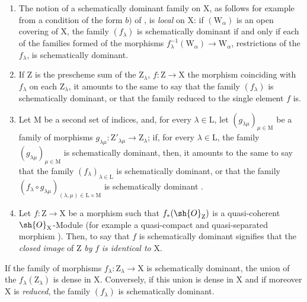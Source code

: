 \begin{remarks}[11.10.3]
\label{IV.11.10.3}
\medskip\noindent
\begin{enumerate}[label=(\roman*)]
  \item The notion of a schematically dominant family on $\mathrm{X}$, as follows for example from a condition of the form $b)$ of , is \emph{local} on $\mathrm{X}$: if $(\mathrm{W}_\alpha)$ is an open covering of $\mathrm{X}$, the family $(f_\lambda)$ is schematically dominant if and only if each of the families formed of the morphisms $f_\lambda^{-1}(\mathrm{W}_\alpha)\to\mathrm{W}_\alpha$, restrictions of the $f_\lambda$, is schematically dominant.
  \item If $\mathrm{Z}$ is the prescheme sum of the $\mathrm{Z}_\lambda$, $f:\mathrm{Z}\to\mathrm{X}$ the morphism coinciding with $f_\lambda$ on each $\mathrm{Z}_\lambda$, it amounts to the same to say that the family $(f_\lambda)$ is schematically dominant, or that the family reduced to the single element $f$ is.
  \item Let $\mathrm{M}$ be a second set of indices, and, for every $\lambda\in\mathrm{L}$, let $(g_{\lambda\mu})_{\mu\in\mathrm{M}}$ be a family of morphisms $g_{\lambda\mu}:\mathrm{Z}'_{\lambda\mu}\to\mathrm{Z}_\lambda$; if, for every $\lambda\in\mathrm{L}$, the family $(g_{\lambda\mu})_{\mu\in\mathrm{M}}$ is schematically dominant, then, it amounts to the same to say that the family $(f_\lambda)_{\lambda\in\mathrm{L}}$ is schematically dominant, or that the family $(f_\lambda\circ g_{\lambda\mu})_{(\lambda,\mu)\in\mathrm{L}\times\mathrm{M}}$ is schematically dominant .
  \item Let $f:\mathrm{Z}\to\mathrm{X}$ be a morphism such that $f_*(\sh{O}_\mathrm{Z})$ is a quasi-coherent $\sh{O}_\mathrm{X}$-Module (for example a quasi-compact and quasi-separated morphism ).
  Then, to say that $f$ is schematically dominant signifies that the \emph{closed image} of $\mathrm{Z}$ \emph{by} $f$  \emph{is identical to} $\mathrm{X}$.
\end{enumerate}
\end{remarks}

\begin{proposition}[11.10.4]
\label{IV.11.10.4}
If the family of morphisms $f_\lambda:\mathrm{Z}_\lambda\to\mathrm{X}$ is schematically dominant, the union of the $f_\lambda(\mathrm{Z}_\lambda)$ is dense in $\mathrm{X}$.
Conversely, if this union is dense in $\mathrm{X}$ and if moreover $\mathrm{X}$ is \emph{reduced}, the family $(f_\lambda)$ is schematically dominant.
\end{proposition}

